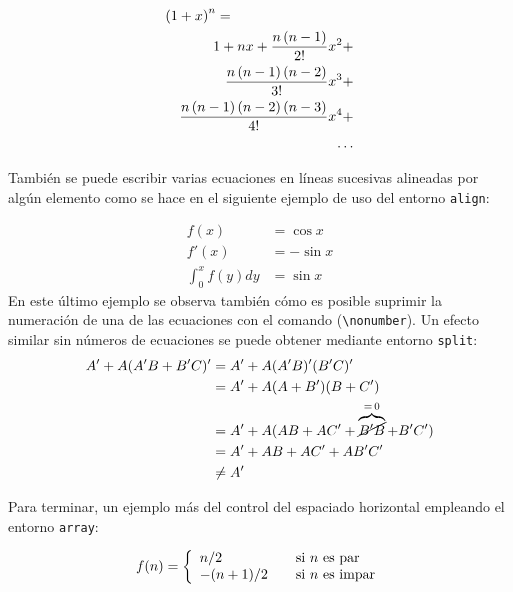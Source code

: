 \documentclass[11pt,a4paper]{article}
\begin{document}
\begin{eqnarray*}
  \lefteqn{\left(1+x\right)^n = } \\
  & & 1 + nx + \frac{n\left(n-1\right)}{2!} x^2 + \\
  & & \frac{n\left(n-1\right)\left(n-2\right)}{3!} x^3 + \\
  & & \frac{n\left(n-1\right)\left(n-2\right)\left(n-3\right)}{4!} x^4 + \\
  & & \ldots
\end{eqnarray*}

También se puede escribir varias ecuaciones en líneas sucesivas alineadas por algún elemento como se hace en el siguiente ejemplo de uso del entorno \texttt{align}:

\begin{align}
f(x) & = \cos x \\
f'(x) & = -\sin x \\
\int_{0}^{x} f(y)dy & = \sin x \nonumber
\end{align}
\noindent En este último ejemplo se observa también cómo es posible suprimir la numeración de una de las ecuaciones con el comando (\texttt{\textbackslash nonumber}). Un efecto similar sin números de ecuaciones se puede obtener mediante entorno \texttt{split}:
\[ \begin{split}
    A'+A(A'B+B'C)' 
      &= A'+A(A'B)'(B'C)' \\
      &= A'+A(A+B')(B+C') \\
      &= A'+A(AB+AC'+\overbrace{\cancel{B'B}}^{=\,0}+B'C')\\ 
      &= A'+AB+AC'+AB'C' \\
      & \neq A'
\end{split}\]



Para terminar, un ejemplo más del control del espaciado horizontal empleando el entorno \texttt{array}:

\[
f(n) = \left\{ 
\begin{array}{l l}
  n/2 & \quad \mbox{si $n$ es par}\\
  -(n+1)/2 & \quad \mbox{si $n$ es impar}\\ 
\end{array} \right. 
\]
\end{document}
